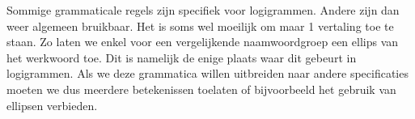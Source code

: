 Sommige grammaticale regels zijn specifiek voor logigrammen. Andere zijn dan weer algemeen bruikbaar. Het is soms wel moeilijk om maar 1 vertaling toe te staan. Zo laten we enkel voor een vergelijkende naamwoordgroep een ellips van het werkwoord toe. Dit is namelijk de enige plaats waar dit gebeurt in logigrammen. Als we deze grammatica willen uitbreiden naar andere specificaties moeten we dus meerdere betekenissen toelaten of bijvoorbeeld het gebruik van ellipsen verbieden.
